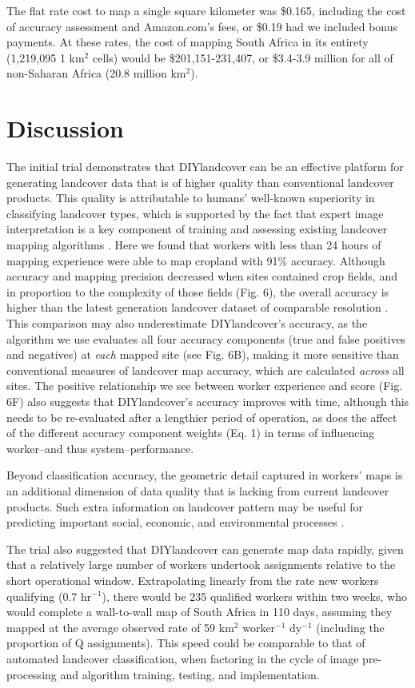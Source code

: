 \documentclass[preprint,12pt,authoryear]{elsarticle}
\begin{document}
The flat rate cost to map a single square kilometer was \$0.165, including the cost of accuracy assessment and Amazon.com's fees, or \$0.19 had we included bonus payments. At these rates, the cost of mapping South Africa in its entirety (1,219,095 1 km$^2$ cells) would be \$201,151-231,407, or \$3.4-3.9 million for all of non-Saharan Africa (20.8 million km$^2$). 

\section{Discussion}
The initial trial demonstrates that DIYlandcover can be an effective platform for generating landcover data that is of higher quality than conventional landcover products. This quality is attributable to humans' well-known superiority in classifying landcover types, which is supported by the fact that expert image interpretation is a key component of training and assessing existing landcover mapping algorithms \citep[e.g.][]{fritz_cropland_2011,fritz_geo-wiki:_2012,hansen_high-resolution_2013}. Here we found that workers with less than 24 hours of mapping experience were able to map cropland with 91\% accuracy. Although accuracy and mapping precision decreased when sites contained crop fields, and in proportion to the complexity of those fields (Fig. 6), the overall accuracy is higher than the latest generation landcover dataset of comparable resolution \citep[82\%;][]{fritz_mapping_2015}. This comparison may also underestimate DIYlandcover's accuracy, as the algorithm we use evaluates all four accuracy components (true and false positives and negatives) at \emph{each} mapped site (see Fig. 6B), making it more sensitive than conventional measures of landcover map accuracy, which are calculated \emph{across} all sites. The positive relationship we see between worker experience and score (Fig. 6F) also suggests that DIYlandcover's accuracy improves with time, although this needs to be re-evaluated after a lengthier period of operation, as does the affect of the different accuracy component weights (Eq. 1) in terms of influencing worker--and thus system--performance. 

Beyond classification accuracy, the geometric detail captured in workers' maps is an additional dimension of data quality that is lacking from current landcover products. Such extra information on landcover pattern may be useful for predicting important social, economic, and environmental processes \citep{fritz_mapping_2015}.   

The trial also suggested that DIYlandcover can generate map data rapidly, given that a relatively large number of workers undertook assignments relative to the short operational window.  Extrapolating linearly from the rate new workers qualifying (0.7 hr$^{-1}$), there would be 235 qualified workers within two weeks, who would complete a wall-to-wall map of South Africa in 110 days, assuming they mapped at the average observed rate of 59 km$^2$ worker$^{-1}$ dy$^{-1}$ (including the proportion of Q assignments). This speed could be comparable to that of automated landcover classification, when factoring in the cycle of image pre-processing and algorithm training, testing, and implementation.  
\end{document}
